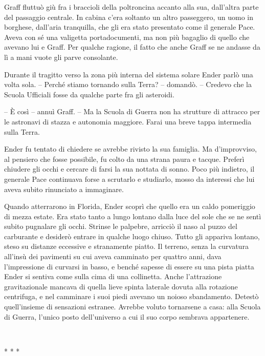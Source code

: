 {Graff fluttuò giù fra i braccioli della poltroncina accanto alla sua,
	dall'altra parte del passaggio centrale. In cabina c'era soltanto un
	altro passeggero, un uomo in borghese, dall'aria tranquilla, che gli era
	stato presentato come il generale Pace. Aveva con sé una valigetta
	portadocumenti, ma non più bagaglio di quello che avevano lui e Graff.
	Per qualche ragione, il fatto che anche Graff se ne andasse da lì a mani
	vuote gli parve consolante.}

{Durante il tragitto verso la zona più interna del sistema solare Ender
	parlò una volta sola. -- Perché stiamo tornando sulla Terra? -- domandò.
	-- Credevo che la Scuola Ufficiali fosse da qualche parte fra gli
	asteroidi.}

{-- È così -- annuì Graff. -- Ma la Scuola di Guerra non ha strutture di
	attracco per le astronavi di stazza e autonomia maggiore. Farai una
	breve tappa intermedia sulla Terra.}

{Ender fu tentato di chiedere se avrebbe rivisto la sua famiglia. Ma
	d'improvviso, al pensiero che fosse possibile, fu colto da una strana
	paura e tacque. Preferì chiudere gli occhi e cercare di farsi la sua
	nottata di sonno. Poco più indietro, il generale Pace continuava forse a
	scrutarlo e studiarlo, mosso da interessi che lui aveva subito
	rinunciato a immaginare.}

{Quando atterrarono in Florida, Ender scoprì che quello era un caldo
	pomeriggio di mezza estate. Era stato tanto a lungo lontano dalla luce
	del sole che se ne sentì subito pugnalare gli occhi. Strinse le
	palpebre, arricciò il naso al puzzo del carburante e desiderò entrare in
	qualche luogo chiuso. Tutto gli appariva lontano, steso su distanze
	eccessive e stranamente piatto. Il terreno, senza la curvatura all'insù
	dei pavimenti su cui aveva camminato per quattro anni, dava
	l'impressione di curvarsi in basso, e benché sapesse di essere su una
	pista piatta Ender si sentiva come sulla cima di una collinetta. Anche
	l'attrazione gravitazionale mancava di quella lieve spinta laterale
	dovuta alla rotazione centrifuga, e nel camminare i suoi piedi avevano
	un noioso sbandamento. Detestò quell'insieme di sensazioni estranee.
	Avrebbe voluto tornarsene a casa: alla Scuola di Guerra, l'unico posto
	dell'universo a cui il suo corpo sembrava appartenere.}

{~}

\begin{center}
	{* * *}
\end{center}

